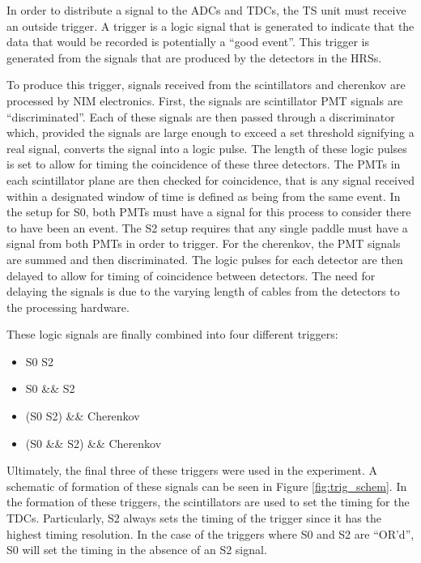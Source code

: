 In order to distribute a signal to the ADCs and TDCs, the TS unit must receive an outside trigger. A trigger is a logic signal that is generated to indicate that the data that would be recorded is potentially a ``good event''. This trigger is generated from the signals that are produced by the detectors in the HRSs.

To produce this trigger, signals received from the scintillators and cherenkov are processed by NIM electronics. First, the signals are scintillator PMT signals are ``discriminated''. Each of these signals are then passed through a discriminator which, provided the signals are large enough to exceed a set threshold signifying a real signal, converts the signal into a logic pulse. The length of these logic pulses is set to allow for timing the coincidence of these three detectors. The PMTs in each scintillator plane are then checked for coincidence, that is any signal received within a designated window of time is defined as being from the same event. In the setup for S0, both PMTs must have a signal for this process to consider there to have been an event. The S2 setup requires that any single paddle must have a signal from both PMTs in order to trigger. For the cherenkov, the PMT signals are summed and then discriminated. The logic pulses for each detector are then delayed to allow for timing of coincidence between detectors. The need for delaying the signals is due to the varying length of cables from the detectors to the processing hardware.

These logic signals are finally combined into four different triggers:
\begin{itemize}
	\item S0 \textbar\textbar{} S2
	\item S0 \&\& S2
	\item (S0 \textbar\textbar{} S2) \&\& Cherenkov
	\item (S0 \&\& S2) \&\& Cherenkov
\end{itemize}
Ultimately, the final three of these triggers were used in the experiment. A schematic of formation of these signals can be seen in Figure \ref{fig:trig_schem}. In the formation of these triggers, the scintillators are used to set the timing for the TDCs. Particularly, S2 always sets the timing of the trigger since it has the highest timing resolution. In the case of the triggers where S0 and S2 are ``OR'd'', S0 will set the timing in the absence of an S2 signal.

